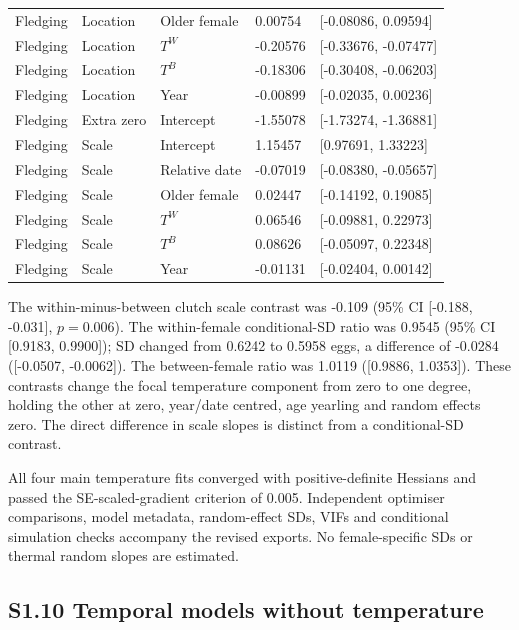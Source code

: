 \documentclass{article}
\begin{document}
\begin{table}[!ht]
\begin{tabular}{lllll}
Fledging & Location & Older female & 0.00754 & [-0.08086, 0.09594]\\
Fledging & Location & $T^W$ & -0.20576 & [-0.33676, -0.07477]\\
Fledging & Location & $T^B$ & -0.18306 & [-0.30408, -0.06203]\\
Fledging & Location & Year & -0.00899 & [-0.02035, 0.00236]\\
Fledging & Extra zero & Intercept & -1.55078 & [-1.73274, -1.36881]\\
Fledging & Scale & Intercept & 1.15457 & [0.97691, 1.33223]\\
Fledging & Scale & Relative date & -0.07019 & [-0.08380, -0.05657]\\
Fledging & Scale & Older female & 0.02447 & [-0.14192, 0.19085]\\
Fledging & Scale & $T^W$ & 0.06546 & [-0.09881, 0.22973]\\
Fledging & Scale & $T^B$ & 0.08626 & [-0.05097, 0.22348]\\
Fledging & Scale & Year & -0.01131 & [-0.02404, 0.00142]\\
\bottomrule\end{tabular}\end{table}
The within-minus-between clutch scale contrast was -0.109 (95\% CI [-0.188, -0.031], $p=0.006$). The within-female conditional-SD ratio was 0.9545 (95\% CI [0.9183, 0.9900]); SD changed from 0.6242 to 0.5958 eggs, a difference of -0.0284 ([-0.0507, -0.0062]). The between-female ratio was 1.0119 ([0.9886, 1.0353]). These contrasts change the focal temperature component from zero to one degree, holding the other at zero, year/date centred, age yearling and random effects zero. The direct difference in scale slopes is distinct from a conditional-SD contrast.

All four main temperature fits converged with positive-definite Hessians and passed the SE-scaled-gradient criterion of 0.005. Independent optimiser comparisons, model metadata, random-effect SDs, VIFs and conditional simulation checks accompany the revised exports. No female-specific SDs or thermal random slopes are estimated.

\subsection{S1.10 Temporal models without temperature}
\label{sec:temporal-without-temperature}
\end{document}
